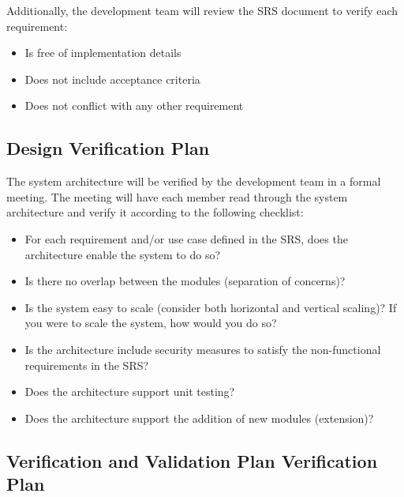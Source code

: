 \documentclass[12pt, titlepage]{article}
\begin{document}
Additionally, the development team will review the SRS document to verify each requirement:
\begin{itemize}
\item Is free of implementation details
\item Does not include acceptance criteria
\item Does not conflict with any other requirement
\end{itemize}


\subsection{Design Verification Plan}




The system architecture will be verified by the development team in a formal meeting. The meeting will have each member read through the system architecture and verify it according to the following checklist:
\begin{itemize}
\item For each requirement and/or use case defined in the SRS, does the architecture enable the system to do so?
\item Is there no overlap between the modules (separation of concerns)?
\item Is the system easy to scale (consider both horizontal and vertical scaling)? If you were to scale the system, how would you do so?
\item Is the architecture include security measures to satisfy the non-functional requirements in the SRS?
\item Does the architecture support unit testing?
\item Does the architecture support the addition of new modules (extension)? 
\end{itemize}

\subsection{Verification and Validation Plan Verification Plan}


\end{document}
